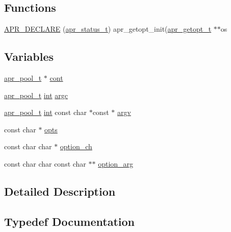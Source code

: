 \subsection*{Functions}
\begin{DoxyCompactItemize}
\item 
\hyperlink{group__apr__getopt_ga29849181eb220ccc0407026401c6639a}{A\+P\+R\+\_\+\+D\+E\+C\+L\+A\+RE} (\hyperlink{group__apr__errno_gaa5105fa83cc322f09382292db8b47593}{apr\+\_\+status\+\_\+t}) apr\+\_\+getopt\+\_\+init(\hyperlink{structapr__getopt__t}{apr\+\_\+getopt\+\_\+t} $\ast$$\ast$os
\end{DoxyCompactItemize}
\subsection*{Variables}
\begin{DoxyCompactItemize}
\item 
\hyperlink{structapr__pool__t}{apr\+\_\+pool\+\_\+t} $\ast$ \hyperlink{group__apr__getopt_gadb9070ef05a170aebb3bab70465af9ac}{cont}
\item 
\hyperlink{structapr__pool__t}{apr\+\_\+pool\+\_\+t} \hyperlink{pcre_8txt_a42dfa4ff673c82d8efe7144098fbc198}{int} \hyperlink{group__apr__getopt_ga6bdebf9385dc069c90aa21989641be02}{argc}
\item 
\hyperlink{structapr__pool__t}{apr\+\_\+pool\+\_\+t} \hyperlink{pcre_8txt_a42dfa4ff673c82d8efe7144098fbc198}{int} const char $\ast$const $\ast$ \hyperlink{group__apr__getopt_ga675a108e956f4e2ea74dae8d26e6273e}{argv}
\item 
const char $\ast$ \hyperlink{group__apr__getopt_ga750f41de75ba000ae8bb4859e91835a1}{opts}
\item 
const char char $\ast$ \hyperlink{group__apr__getopt_ga4684e1412a5bbd73e963c3dbb45dc3f0}{option\+\_\+ch}
\item 
const char char const char $\ast$$\ast$ \hyperlink{group__apr__getopt_ga237497a2dba41f8f2e6999065f542e3e}{option\+\_\+arg}
\end{DoxyCompactItemize}


\subsection{Detailed Description}


\subsection{Typedef Documentation}
